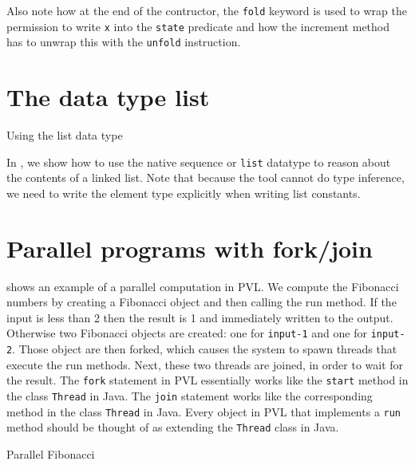 Also note how at the end of the contructor,
the \lstinline+fold+ keyword is used to wrap the permission
to write \lstinline+x+ into the \lstinline+state+ predicate and how the increment
method has to unwrap this with the \lstinline+unfold+ instruction.

\section{The data type list}\label{sec:list}
\label{list examples}

\begin{listing}

\caption{Using the list data type}
\label{list}
\end{listing}

In , we show how to use the native sequence or \lstinline+list+ datatype
to reason about the contents of a linked list. Note that because the tool
cannot do type inference, we need to write the element type explicitly
when writing list constants.

\section{Parallel programs with fork/join}\label{sec:forkjoin}


 shows an example of a parallel computation
in PVL. We compute the Fibonacci numbers by creating a Fibonacci object
and then calling the run method. If the input is less than 2 then the result is
1 and immediately written to the output. Otherwise two Fibonacci objects are created: one for \lstinline+input-1+ and
one for \lstinline+input-2+. Those object are then forked, which causes the system
to spawn threads that execute the run methods. Next, these two threads are joined, in order to wait for the result.
The \lstinline+fork+ statement in PVL essentially works like the \lstinline+start+ method in the
class \lstinline+Thread+ in Java. The \lstinline+join+ statement works like the corresponding
method in the class \lstinline+Thread+ in Java. Every object in PVL that implements a \lstinline+run+ method
should be thought of as extending the \lstinline+Thread+ class in Java.

\begin{listing}

\caption{Parallel Fibonacci}
\label{fibonacci}
\end{listing}


